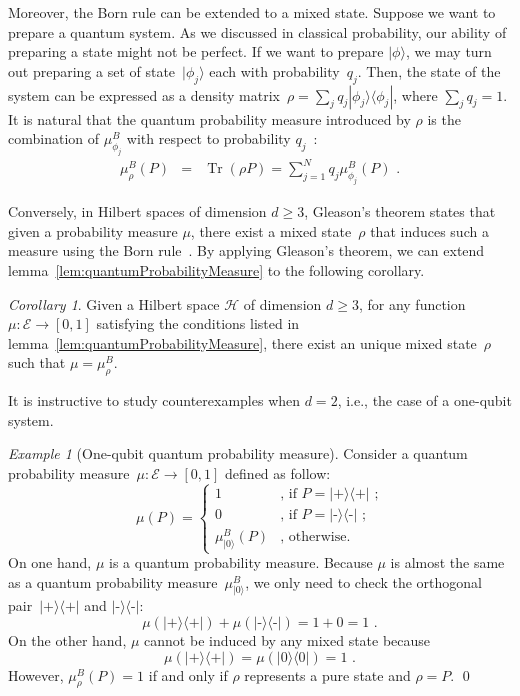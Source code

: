 \documentclass{article}
\theoremstyle{remark}
\newtheorem{example}{Example}
\newtheorem{cor}{Corollary}
\newcommand{\events}{\ensuremath{\mathcal{E}}}
\newcommand{\Hilb}{\mathcal{H}}
\newcommand{\ket}[1]{|#1\rangle}
\newcommand{\proj}[1]{|#1 \rangle\langle #1 |}
\newcommand{\ps}{\texttt{+}}
\newcommand{\ms}{\texttt{-}}
\newcommand{\Tr}{\mathop{\mathrm{Tr}}\nolimits}
\begin{document}
Moreover, the Born rule can be extended to a mixed state. Suppose
we want to prepare a quantum system. As we discussed in classical
probability, our ability of preparing a state might not be perfect.
If we want to prepare $\ket{\phi}$, we may turn out preparing a set
of state~$\ket{\phi_{j}}$ each with probability~$q_{j}$. Then,
the state of the system can be expressed as a density matrix~$\rho=\sum_{j}q_{j}\proj{\phi_{j}}$,
where $\sum_{j}q_{j}=1$. It is natural that the quantum probability
measure introduced by $\rho$ is the combination of $\mu^B_{\phi_{j}}$
with respect to probability $q_{j}$~\cite{peres1995quantum,544199,RiederSvozil2007}:
\begin{eqnarray}
\mu^B_{\rho}\left(P\right) & = & \Tr\left(\rho P\right)=\sum_{j=1}^{N}q_{j}\mu^B_{\phi_{j}}\left(P\right)\textrm{ .}\label{BornRule.mixed}
\end{eqnarray}

Conversely, in Hilbert spaces of dimension $d\geq3$, Gleason's theorem
states that given a probability measure $\mu$, there exist a mixed
state~$\rho$ that induces such a measure using the Born rule~\cite{gleason1957,Redhead1987-REDINA,peres1995quantum}.
By applying Gleason's theorem, we can extend lemma~\ref{lem:quantumProbabilityMeasure}
to the following corollary.

\begin{cor}\label{cor:Gleason's}Given a Hilbert space $\Hilb$ of dimension
$d\geq3$, for any function~$\mu:\events\rightarrow[0,1]$ satisfying the conditions
listed in lemma~\ref{lem:quantumProbabilityMeasure}, there exist
an unique mixed state~$\rho$ such that $\mu=\mu^B_{\rho}$.\end{cor}

It is instructive to study counterexamples when $d=2$, i.e., the
case of a one-qubit system.

\begin{example}[One-qubit quantum probability measure] Consider
a quantum probability measure~$\mu:\events\rightarrow[0,1]$ defined
as follow: 
\[
\mu(P)=\begin{cases}
1 & \textrm{, if }P=\proj{\ps}\textrm{ ;}\\
0 & \textrm{, if }P=\proj{\ms}\textrm{ ;}\\
\mu^B_{\ket{0}}(P) & \textrm{, otherwise.}
\end{cases}
\]
On one hand, $\mu$ is a quantum probability measure. Because $\mu$ is almost
the same as a quantum probability measure~$\mu^B_{\ket{0}}$, we only
need to check the orthogonal pair~$\proj{\ps}$ and $\proj{\ms}$:
\[
\mu(\proj{\ps})+\mu(\proj{\ms})=1+0=1\textrm{ .}
\]
On the other hand, $\mu$ cannot be induced by any mixed state because
\[
\mu(\proj{\ps})=\mu(\proj{0})=1\textrm{ .}
\]
However, $\mu^B_{\rho}(P)=1$ if and only if $\rho$ represents
a pure state and $\rho=P$. \qed\end{example}
\end{document}
